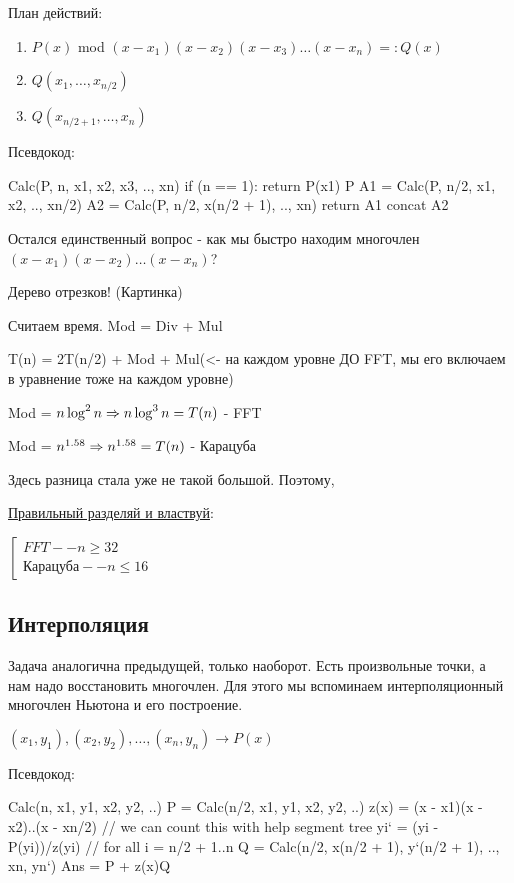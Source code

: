 План действий:
\begin{enumerate}
    \item $P(x)$ mod $(x - x_1)(x - x_2)(x - x_3)\dots(x - x_n) =: Q(x)$
    \item $Q(x_1, \dots, x_{n/2})$
    \item $Q(x_{n/2 + 1}, \dots, x_n)$ 
\end{enumerate}                         

Псевдокод:
\begin{cppcode}
Calc(P, n, x1, x2, x3, .., xn) {
    if (n == 1): return P(x1)
    P %
    A1 = Calc(P, n/2, x1, x2, .., xn/2)
    A2 = Calc(P, n/2, x(n/2 + 1), .., xn)
    return A1 concat A2
}
\end{cppcode}   

Остался единственный вопрос - как мы быстро находим многочлен $(x - x_1)(x - x_2)\dots(x - x_n)$?

Дерево отрезков! (Картинка) 

Считаем время. Mod = Div + Mul

T(n) = 2T(n/2) + Mod + Mul(<- на каждом уровне ДО FFT, мы его включаем в уравнение тоже на каждом уровне)

Mod = $n \log^2 n \Rightarrow n \log^3 n = T(n)$ - FFT

Mod = $n^{1.58} \Rightarrow n^{1.58} = T(n)$ - Карацуба

Здесь разница стала уже не такой большой. Поэтому, 

\underline{Правильный разделяй и властвуй}:

$\left[
    \begin{gathered}
    FFT -- n \ge 32 \\
    \text{Карацуба} -- n \le 16
    \end{gathered}
\right.$

\subsection{Интерполяция}
Задача аналогична предыдущей, только наоборот. Есть произвольные точки, а нам надо восстановить многочлен. Для этого мы вспоминаем интерполяционный многочлен Ньютона и его построение.

$(x_1, y_1), (x_2, y_2), \dots, (x_n, y_n) \rightarrow P(x)$

Псевдокод:

\begin{cppcode}
Calc(n, x1, y1, x2, y2, ..)
    P = Calc(n/2, x1, y1, x2, y2, ..)
    z(x) = (x - x1)(x - x2)..(x - xn/2) // we can count this with help segment tree
    yi` = (yi - P(yi))/z(yi) // for all i = n/2 + 1..n
    Q = Calc(n/2, x(n/2 + 1), y`(n/2 + 1), .., xn, yn`)
    Ans = P + z(x)Q
\end{cppcode}

